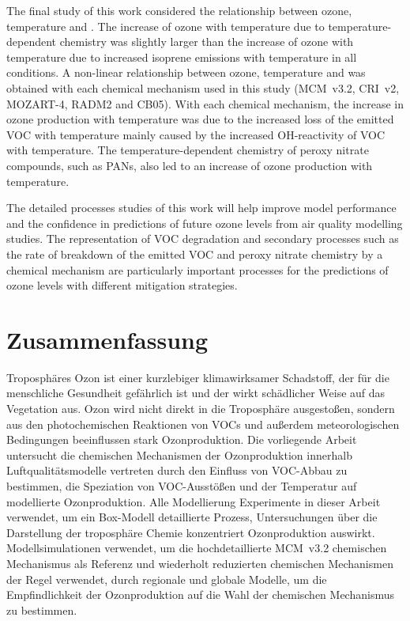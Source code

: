 The final study of this work considered the relationship between ozone, temperature and .
The increase of ozone with temperature due to temperature-dependent chemistry was slightly larger than the increase of ozone with temperature due to increased isoprene emissions with temperature in all  conditions.
A non-linear relationship between ozone, temperature and  was obtained with each chemical mechanism used in this study (MCM~v3.2, CRI~v2, MOZART-4, RADM2 and CB05).
With each chemical mechanism, the increase in ozone production with temperature was due to the increased loss of the emitted VOC with temperature mainly caused by the increased OH-reactivity of VOC with temperature.
The temperature-dependent chemistry of peroxy nitrate compounds, such as PANs, also led to an increase of ozone production with temperature.

The detailed processes studies of this work will help improve model performance and the confidence in predictions of future ozone levels from air quality modelling studies.
The representation of VOC degradation and secondary processes such as the rate of breakdown of the emitted VOC and peroxy nitrate chemistry by a chemical mechanism are particularly important processes for the predictions of ozone levels with different mitigation strategies.

\newpage
\section{Zusammenfassung}
Troposphäres Ozon ist einer kurzlebiger klimawirksamer Schadstoff, der für die menschliche Gesundheit gefährlich ist und der wirkt schädlicher Weise auf das Vegetation aus.
Ozon wird nicht direkt in die Troposphäre ausgestoßen, sondern aus den photochemischen Reaktionen von VOCs und  außerdem meteorologischen Bedingungen beeinflussen stark Ozonproduktion.
Die vorliegende Arbeit untersucht die chemischen Mechanismen der Ozonproduktion innerhalb Luftqualitätsmodelle vertreten durch den Einfluss von VOC-Abbau zu bestimmen, die Speziation von VOC-Ausstößen und der Temperatur auf modellierte Ozonproduktion.
Alle Modellierung Experimente in dieser Arbeit verwendet, um ein Box-Modell detaillierte Prozess, Untersuchungen über die Darstellung der troposphäre Chemie konzentriert Ozonproduktion auswirkt.
Modellsimulationen verwendet, um die hochdetaillierte MCM~v3.2 chemischen Mechanismus als Referenz und wiederholt reduzierten chemischen Mechanismen der Regel verwendet, durch regionale und globale Modelle, um die Empfindlichkeit der Ozonproduktion auf die Wahl der chemischen Mechanismus zu bestimmen.

